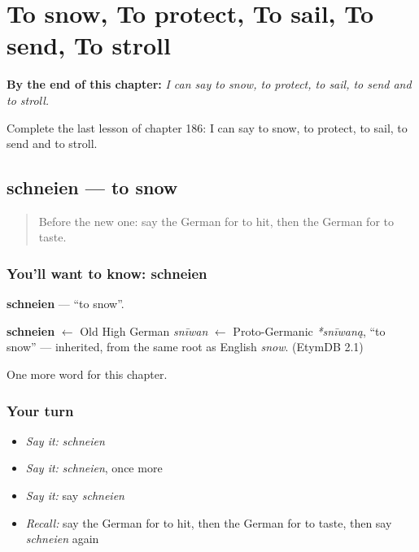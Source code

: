 
\chapter{To snow, To protect, To sail, To send, To stroll}
\label{ch:ge-to-snow-to-protect-to-sail-to-send-to-stroll}

\begin{chapteropening}
\textbf{By the end of this chapter:} \emph{I can say to snow, to protect, to sail, to send and to stroll.}

Complete the last lesson of chapter 186: I can say to snow, to protect, to sail, to send and to stroll.
\end{chapteropening}

\section[schneien]{schneien — to snow}

\label{lesson:GE-C186-schneien}



\begin{quote}
Before the new one: say the German for to hit, then the German for to taste.
\end{quote}

\subsection*{You'll want to know: schneien}
\textbf{schneien} — \textquotedblleft{}to snow\textquotedblright{}.

\begin{cousinweb}
\textbf{schneien} $\leftarrow$ Old High German \emph{snīwan} $\leftarrow$ Proto-Germanic \emph{*snīwaną}, \textquotedblleft{}to snow\textquotedblright{} — inherited, from the same root as English \emph{snow}. (EtymDB 2.1)
\end{cousinweb}

\begin{grammarlens}[title={What you've built}]
One more word for this chapter.
\end{grammarlens}

\subsection*{Your turn}
\begin{itemize}
\raggedright
  \item \emph{Say it:} \emph{schneien}
  \item \emph{Say it:} \emph{schneien}, once more
  \item \emph{Say it:} say \emph{schneien}
  \item \emph{Recall:} say the German for to hit, then the German for to taste, then say \emph{schneien} again
\end{itemize}

